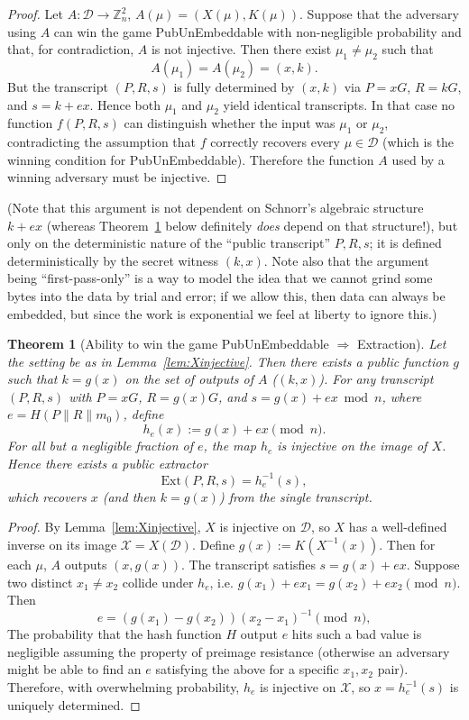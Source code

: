 \documentclass[10pt,a4paper]{article}
\newtheorem{theorem}{Theorem}
\theoremstyle{definition}   %
\theoremstyle{remark}       %
\begin{document}
\begin{proof}
Let $A:\mathcal{D}\to \mathbb{Z}_n^2$, $A(\mu)=(X(\mu),K(\mu))$.
Suppose that the adversary using $A$ can win the game PubUnEmbeddable with non-negligible probability and that, for contradiction, $A$ is not injective.
Then there exist $\mu_1\neq \mu_2$ such that
\[
A(\mu_1) = A(\mu_2) = (x,k).
\]
But the transcript $(P,R,s)$ is fully determined by $(x,k)$ via
$P=xG$, $R=kG$, and $s=k+ex$. Hence both $\mu_1$ and $\mu_2$ yield
identical transcripts. In that case no function $f(P,R,s)$ can
distinguish whether the input was $\mu_1$ or $\mu_2$, contradicting
the assumption that $f$ correctly recovers every $\mu\in\mathcal D$ (which is the winning condition for PubUnEmbeddable).
Therefore the function $A$ used by a winning adversary must be injective.
\end{proof}

(Note that this argument is not dependent on Schnorr's algebraic structure $k + ex$ (whereas Theorem~\ref{thm:extraction} below definitely \emph{does} depend on that structure!), but only on the deterministic nature of the ``public transcript'' $P, R, s$; it is defined deterministically by the secret witness $(k, x)$. Note also that the argument being ``first-pass-only'' is a way to model the idea that we cannot grind some bytes into the data by trial and error; if we allow this, then data can always be embedded, but since the work is exponential we feel at liberty to ignore this.)

\begin{theorem}[Ability to win the game PubUnEmbeddable $\Rightarrow$ Extraction]
\label{thm:extraction}
Let the setting be as in Lemma~\ref{lem:Xinjective}.
Then there exists a public function $g$ such that $k=g(x)$ on the set of outputs of $A$ ($(k, x)$).
For any transcript $(P,R,s)$ with $P=xG$, $R=g(x)G$, and $s=g(x)+ex\bmod n$,
where $e=H(P\|R\|m_0)$, define
\[
h_e(x) := g(x) + e x \pmod n.
\]
For all but a negligible fraction of $e$, the map $h_e$ is injective on
the image of $X$. Hence there exists a public extractor
\[
\mathrm{Ext}(P,R,s) = h_e^{-1}(s),
\]
which recovers $x$ (and then $k=g(x)$) from the single transcript.
\end{theorem}

\begin{proof}
By Lemma~\ref{lem:Xinjective}, $X$ is injective on $\mathcal{D}$,
so $X$ has a well-defined inverse on its image $\mathcal{X}=X(\mathcal{D})$.
Define $g(x):=K(X^{-1}(x))$. Then for each $\mu$, $A$ outputs $(x,g(x))$.
The transcript satisfies $s=g(x)+ex$.
Suppose two distinct $x_1\neq x_2$ collide under $h_e$, i.e.
$g(x_1)+e x_1 = g(x_2)+e x_2 \pmod n$.
Then
\[
e = (g(x_1)-g(x_2))(x_2-x_1)^{-1}\pmod n,
\]
The probability that the hash function $H$ output $e$
hits such a bad value is negligible assuming the property of preimage resistance (otherwise an adversary might be able to find an $e$ satisfying the above for a specific $x_1, x_2$ pair). Therefore, with overwhelming probability, $h_e$ is injective on $\mathcal{X}$, so $x=h_e^{-1}(s)$ is uniquely determined.
\end{proof}
\end{document}
